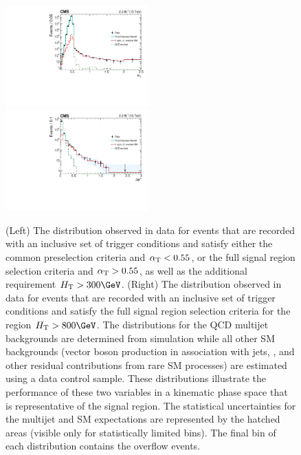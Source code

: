 \begin{figure}[!h]
  \begin{center}
    \includegraphics[width=0.49\textwidth]{figures/kine/v1/AlphaT_Paper} \,
    \includegraphics[width=0.49\textwidth]{figures/kine/v1/BDPhi_paper} \\
  \end{center}
  \caption{ (Left) The \alphat distribution observed in data for
    events that are recorded with an inclusive set of trigger
    conditions and satisfy either the common preselection criteria and
    $\alphat < 0.55$, or the full signal region selection criteria and
    $\alphat > 0.55$, as well as the additional requirement $\scalht >
    300\GeV$.  (Right) The \bdphi distribution observed in data for
    events that are recorded with an inclusive set of trigger
    conditions and satisfy the full signal region selection criteria
    for the region $\scalht > 800\GeV$.  The distributions for the QCD
    multijet backgrounds are determined from simulation while all
    other SM backgrounds (vector boson production in association with
    jets, \ttbar, and other residual contributions from rare SM
    processes) are estimated using a \mj data control sample.  These
    distributions illustrate the performance of these two variables in
    a kinematic phase space that is representative of the signal
    region. The statistical uncertainties for the multijet and SM
    expectations are represented by the hatched areas (visible only
    for statistically limited bins). The final bin of each
    distribution contains the overflow events.  }
  \label{fig:alphat-bdphi} 
\end{figure}

